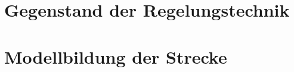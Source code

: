 \documentclass{LxUm}
\begin{document}
 
\singlespacing
 
\sffamily
 
 \EMPTYPAGE

\chapter{Gegenstand der Regelungstechnik} 
\chapter{Modellbildung der Strecke} 

\end{document}
